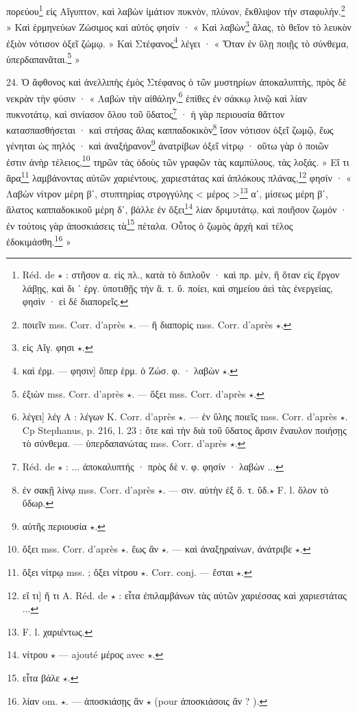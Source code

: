 \documentclass[a4paper, 11pt, oneside, polutonikogreek, french]{article}
\begin{document}
πορεύου\footnote{Réd. de $\star$ : στῆσον α. εἰς πλ., κατὰ τὸ διπλοῦν · καὶ πρ. μὲν, ἢ ὅταν εἰς ἕργον λάβῃς, καὶ δι ᾽ ἐργ. ὑποτιθῇς τὴν ἄ. τ. ὕ. ποίει, καὶ σημείου ἀεὶ τὰς ἐνεργείας, φησὶν · εἰ δὲ διαπορεῖς.} εἰς Αἴγυπτον, καὶ λαβὼν ἱμάτιον πυκνὸν, πλύνον, ἔκθλιψον τὴν σταφυλήν.\footnote{ποιεῖν mss. Corr. d'après $\star$. --- ἢ διαπορὶς mss. Corr. d'après $\star$.} » Καὶ ἑρμηνεύων Ζώσιμος καὶ αὐτὸς φησίν · « Καὶ λαβὼν\footnote{εἰς Αἴγ. φησι $\star$.} ἅλας, τὸ θεῖον τὸ λευκὸν ἐξιὸν νότισον ὀξεῖ ζώμῳ. » Καὶ Στέφανος\footnote{καὶ ἐρμ. --- φησιν] ὅπερ ἑρμ. ὁ Ζώσ. φ. · λαβὼν $\star$.} λέγει · « Ὅταν ἐν ὕλῃ ποιῇς τὸ σύνθεμα, ὑπερδαπανᾶται.\footnote{ἐξιὼν mss. Corr. d'après $\star$. --- ὄξει mss. Corr. d'après $\star$.} »

24. Ὁ ἄφθονος καὶ ἀνελλιπὴς ἐμὸς Στέφανος ὁ τῶν μυστηρίων ἀποκαλυπτὴς, πρὸς δὲ νεκρὰν τὴν φύσιν · « Λαβὼν τὴν αἰθάλην,\footnote{λέγει] λέγ A : λέγων K. Corr. d'après $\star$. --- ἐν ὕλης ποιεῖς mss. Corr. d'après $\star$. Cp Stephanus, p. 216, l. 23 : ὅτε καὶ τὴν διὰ τοῦ ὕδατος ἄρσιν ἔναυλον ποιήσῃς τὸ σύνθεμα. --- ὑπερδαπανώτας mss. Corr. d'après $\star$.} ἐπίθες ἐν σάκκῳ λινῷ καὶ λίαν πυκνοτάτῳ, καὶ σινίασον ὅλου τοῦ ὕδατος\footnote{Réd. de $\star$ : ... ἀποκαλυπτής · πρὸς δὲ ν. φ. φησίν · λαβὼν ...} · ἡ γὰρ περιουσία θἄττον κατασπασθήσεται · καὶ στήσας ἅλας καππαδοκικὸν\footnote{ἐν σακῇ λίνῳ mss. Corr. d'après $\star$. --- σιν. αὐτὴν ἐξ ὅ. τ. ὕδ.$\star$ F. l. ὅλον τὸ ὕδωρ.} ἴσον νότισον ὀξεῖ ζωμῷ, ἕως γένηται ὡς πηλός · καὶ ἀναξήρανον\footnote{αὐτῆς περιουσία $\star$.} ἀνατρίβων ὀξεῖ νίτρῳ · οὕτω γὰρ ὁ ποιῶν ἐστιν ἀνὴρ τέλειος,\footnote{ὄξει mss. Corr. d'après $\star$. ἕως ἂν $\star$. --- καὶ ἀναξηραίνων, ἀνάτριβε $\star$.} τηρῶν τὰς ὁδοὺς τῶν γραφῶν τὰς καμπύλους, τὰς λοξάς. » Εἴ τι ἄρα\footnote{ὄξει νίτρῳ mss. ; ὄξει νίτρου $\star$. Corr. conj. --- ἔσται $\star$.} λαμβάνοντας αὐτῶν χαριέντους, χαριεστάτας καὶ ἀπλόκους πλάνας,\footnote{εἴ τι] ἥ τι A. Réd. de $\star$ : εἶτα ἐπιλαμβάνων τὰς αὐτῶν χαριέσσας καὶ χαριεστάτας ...} φησίν · « Λαβὼν νίτρον μέρη βʹ, στυπτηρίας στρογγύλης < μέρος >\footnote{F. l. χαριέντως.} αʹ, μίσεως μέρη βʹ, ἅλατος καππαδοκικοῦ μέρη δʹ, βάλλε ἐν ὄξει\footnote{νίτρου $\star$ --- ajouté μέρος avec $\star$.} λίαν δριμυτάτῳ, καὶ ποιῆσον ζωμόν · ἐν τούτοις γὰρ ἀποσκιάσεις τὰ\footnote{εἶτα βάλε $\star$.} πέταλα. Οὗτος ὁ ζωμὸς ἀρχὴ καὶ τέλος ἐδοκιμάσθη.\footnote{λίαν om. $\star$. --- ἀποσκιάσῃς ἂν $\star$ (pour ἀποσκιάσοις ἂν ? ).} »

\bigskip
\centerline{\EightStarTaper}
\centerline{\EightStarTaper\EightStarTaper}
\bigskip
\end{document}
